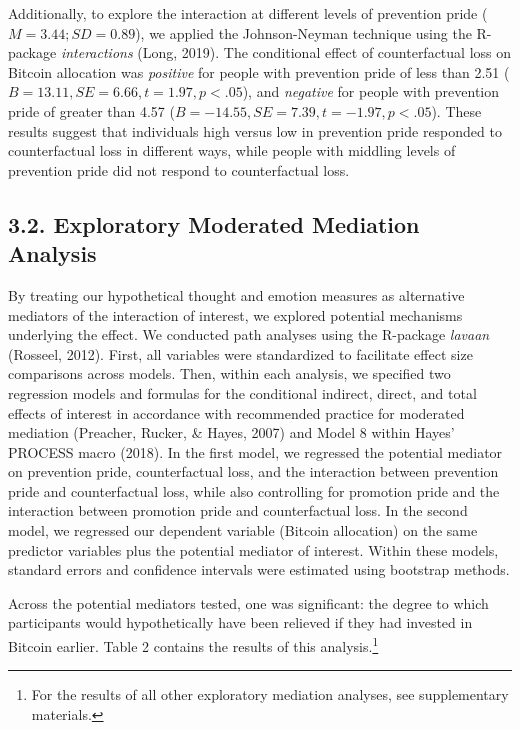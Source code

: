 \documentclass[man,floatsintext]{apa6}
\let\rmarkdownfootnote\footnote%
\def\footnote{\protect\rmarkdownfootnote}
\begin{document}
Additionally, to explore the interaction at different levels of prevention pride (\(M=3.44; SD=0.89\)), we applied the Johnson-Neyman technique using the R-package \emph{interactions} (Long, 2019). The conditional effect of counterfactual loss on Bitcoin allocation was \emph{positive} for people with prevention pride of less than 2.51 (\(B=13.11, SE=6.66, t=1.97, p<.05\)), and \emph{negative} for people with prevention pride of greater than 4.57 (\(B=-14.55, SE=7.39, t=-1.97, p<.05\)). These results suggest that individuals high versus low in prevention pride responded to counterfactual loss in different ways, while people with middling levels of prevention pride did not respond to counterfactual loss.

\hypertarget{exploratory-moderated-mediation-analysis}{%
\subsection{3.2. Exploratory Moderated Mediation Analysis}\label{exploratory-moderated-mediation-analysis}}

By treating our hypothetical thought and emotion measures as alternative mediators of the interaction of interest, we explored potential mechanisms underlying the effect. We conducted path analyses using the R-package \emph{lavaan} (Rosseel, 2012). First, all variables were standardized to facilitate effect size comparisons across models. Then, within each analysis, we specified two regression models and formulas for the conditional indirect, direct, and total effects of interest in accordance with recommended practice for moderated mediation (Preacher, Rucker, \& Hayes, 2007) and Model 8 within Hayes' PROCESS macro (2018). In the first model, we regressed the potential mediator on prevention pride, counterfactual loss, and the interaction between prevention pride and counterfactual loss, while also controlling for promotion pride and the interaction between promotion pride and counterfactual loss. In the second model, we regressed our dependent variable (Bitcoin allocation) on the same predictor variables plus the potential mediator of interest. Within these models, standard errors and confidence intervals were estimated using bootstrap methods.

Across the potential mediators tested, one was significant: the degree to which participants would hypothetically have been relieved if they had invested in Bitcoin earlier. Table 2 contains the results of this analysis.\footnote{For the results of all other exploratory mediation analyses, see supplementary materials.}
\end{document}
